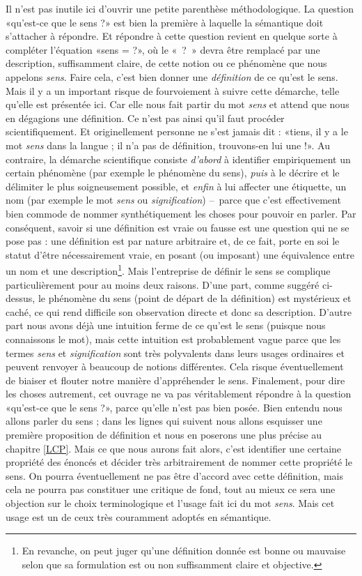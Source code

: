 \begin{refsegment}
Il n'est pas inutile ici d'ouvrir une petite parenthèse méthodologique. 
La question «qu'est-ce que le sens ?» %
est bien la première à laquelle la sémantique doit s'attacher à répondre.
Et répondre à cette question revient en quelque sorte à compléter l'équation «sens = ?», où le «~?~» devra être remplacé par une description, suffisamment claire, de cette notion ou ce phénomène que nous appelons \emph{sens}.  
Faire cela, c'est bien donner une \emph{définition} de ce qu'est le sens. 
Mais il y a un important risque de fourvoiement à suivre cette démarche, telle qu'elle est présentée ici. Car elle nous fait partir du mot \emph{sens} et attend que nous en dégagions une définition.  Ce n'est pas ainsi qu'il faut procéder scientifiquement.  Et originellement personne ne s'est jamais dit : «tiens, il y a le mot \emph{sens} dans la langue ; il n'a pas de définition, trouvons-en lui une !». 
Au contraire, la démarche scientifique consiste \emph{d'abord} à identifier empiriquement un certain phénomène (par exemple le phénomène du sens), \emph{puis} à le décrire et le délimiter le plus soigneusement possible, et \emph{enfin} à lui affecter une étiquette, un nom (par exemple le mot \emph{sens} ou \emph{signification}) --~parce que c'est effectivement bien commode de nommer synthétiquement les choses pour pouvoir en parler.  
Par conséquent, savoir si une définition est vraie ou fausse est une question qui ne se pose pas : une définition est par nature arbitraire et, de ce fait, porte en soi le statut d'être nécessairement vraie, en posant (ou imposant) une équivalence entre un nom et une description\footnote{En revanche, on peut juger qu'une définition donnée est bonne ou mauvaise selon que sa formulation est ou non suffisamment claire et objective.}.
Mais l'entreprise de définir le sens se complique particulièrement pour au moins deux raisons. D'une part, comme suggéré ci-dessus, le phénomène du sens (point de départ de la définition) est mystérieux et caché, ce qui rend difficile son observation directe et donc sa description.  D'autre part nous  avons déjà une intuition ferme de ce qu'est le sens (puisque nous connaissons le mot), mais cette intuition est probablement vague parce que les termes \emph{sens} et \emph{signification} sont très polyvalents dans leurs usages ordinaires et peuvent renvoyer à beaucoup de notions différentes. Cela risque éventuellement de biaiser et flouter notre manière d'appréhender le sens.  Finalement, pour dire les choses autrement, cet ouvrage ne va pas véritablement répondre à la question «qu'est-ce que le sens ?», parce qu'elle n'est pas bien posée.  Bien entendu nous allons parler du sens ; dans les lignes qui suivent nous allons esquisser une première proposition de définition et nous en poserons une plus précise au chapitre \ref{LCP}.  Mais ce que nous aurons fait alors, c'est identifier une certaine propriété des énoncés et décider très arbitrairement de nommer cette propriété le sens.  On pourra éventuellement ne pas être d'accord avec cette définition, mais cela ne pourra pas constituer une critique de fond, tout au mieux ce sera une objection sur le choix terminologique et l'usage fait ici du mot \emph{sens}.  Mais cet usage est un de ceux très couramment adoptés en sémantique. 


\end{refsegment}
